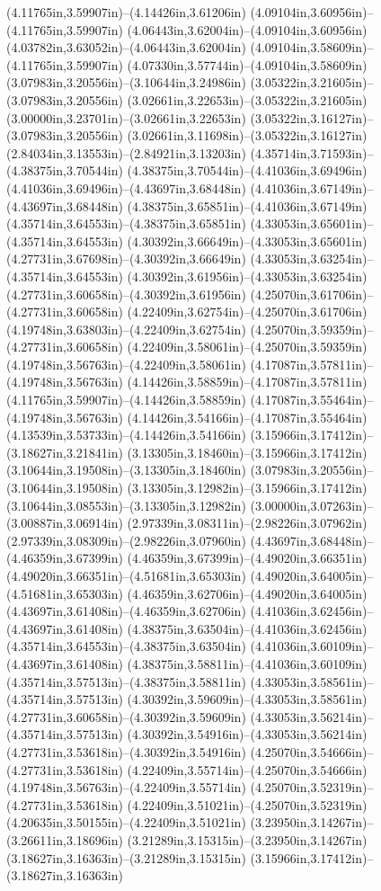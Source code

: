 (4.11765in,3.59907in)--(4.14426in,3.61206in) (4.09104in,3.60956in)--(4.11765in,3.59907in) (4.06443in,3.62004in)--(4.09104in,3.60956in) (4.03782in,3.63052in)--(4.06443in,3.62004in) (4.09104in,3.58609in)--(4.11765in,3.59907in) (4.07330in,3.57744in)--(4.09104in,3.58609in) (3.07983in,3.20556in)--(3.10644in,3.24986in) (3.05322in,3.21605in)--(3.07983in,3.20556in) (3.02661in,3.22653in)--(3.05322in,3.21605in) (3.00000in,3.23701in)--(3.02661in,3.22653in) (3.05322in,3.16127in)--(3.07983in,3.20556in) (3.02661in,3.11698in)--(3.05322in,3.16127in) (2.84034in,3.13553in)--(2.84921in,3.13203in) (4.35714in,3.71593in)--(4.38375in,3.70544in) (4.38375in,3.70544in)--(4.41036in,3.69496in) (4.41036in,3.69496in)--(4.43697in,3.68448in) (4.41036in,3.67149in)--(4.43697in,3.68448in) (4.38375in,3.65851in)--(4.41036in,3.67149in) (4.35714in,3.64553in)--(4.38375in,3.65851in) (4.33053in,3.65601in)--(4.35714in,3.64553in) (4.30392in,3.66649in)--(4.33053in,3.65601in) (4.27731in,3.67698in)--(4.30392in,3.66649in) (4.33053in,3.63254in)--(4.35714in,3.64553in) (4.30392in,3.61956in)--(4.33053in,3.63254in) (4.27731in,3.60658in)--(4.30392in,3.61956in) (4.25070in,3.61706in)--(4.27731in,3.60658in) (4.22409in,3.62754in)--(4.25070in,3.61706in) (4.19748in,3.63803in)--(4.22409in,3.62754in) (4.25070in,3.59359in)--(4.27731in,3.60658in) (4.22409in,3.58061in)--(4.25070in,3.59359in) (4.19748in,3.56763in)--(4.22409in,3.58061in) (4.17087in,3.57811in)--(4.19748in,3.56763in) (4.14426in,3.58859in)--(4.17087in,3.57811in) (4.11765in,3.59907in)--(4.14426in,3.58859in) (4.17087in,3.55464in)--(4.19748in,3.56763in) (4.14426in,3.54166in)--(4.17087in,3.55464in) (4.13539in,3.53733in)--(4.14426in,3.54166in) (3.15966in,3.17412in)--(3.18627in,3.21841in) (3.13305in,3.18460in)--(3.15966in,3.17412in) (3.10644in,3.19508in)--(3.13305in,3.18460in) (3.07983in,3.20556in)--(3.10644in,3.19508in) (3.13305in,3.12982in)--(3.15966in,3.17412in) (3.10644in,3.08553in)--(3.13305in,3.12982in) (3.00000in,3.07263in)--(3.00887in,3.06914in) (2.97339in,3.08311in)--(2.98226in,3.07962in) (2.97339in,3.08309in)--(2.98226in,3.07960in) (4.43697in,3.68448in)--(4.46359in,3.67399in) (4.46359in,3.67399in)--(4.49020in,3.66351in) (4.49020in,3.66351in)--(4.51681in,3.65303in) (4.49020in,3.64005in)--(4.51681in,3.65303in) (4.46359in,3.62706in)--(4.49020in,3.64005in) (4.43697in,3.61408in)--(4.46359in,3.62706in) (4.41036in,3.62456in)--(4.43697in,3.61408in) (4.38375in,3.63504in)--(4.41036in,3.62456in) (4.35714in,3.64553in)--(4.38375in,3.63504in) (4.41036in,3.60109in)--(4.43697in,3.61408in) (4.38375in,3.58811in)--(4.41036in,3.60109in) (4.35714in,3.57513in)--(4.38375in,3.58811in) (4.33053in,3.58561in)--(4.35714in,3.57513in) (4.30392in,3.59609in)--(4.33053in,3.58561in) (4.27731in,3.60658in)--(4.30392in,3.59609in) (4.33053in,3.56214in)--(4.35714in,3.57513in) (4.30392in,3.54916in)--(4.33053in,3.56214in) (4.27731in,3.53618in)--(4.30392in,3.54916in) (4.25070in,3.54666in)--(4.27731in,3.53618in) (4.22409in,3.55714in)--(4.25070in,3.54666in) (4.19748in,3.56763in)--(4.22409in,3.55714in) (4.25070in,3.52319in)--(4.27731in,3.53618in) (4.22409in,3.51021in)--(4.25070in,3.52319in) (4.20635in,3.50155in)--(4.22409in,3.51021in) (3.23950in,3.14267in)--(3.26611in,3.18696in) (3.21289in,3.15315in)--(3.23950in,3.14267in) (3.18627in,3.16363in)--(3.21289in,3.15315in) (3.15966in,3.17412in)--(3.18627in,3.16363in) 
